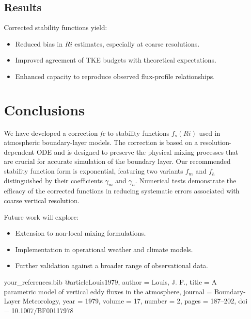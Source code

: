 \documentclass[12pt]{article}
\begin{document}
\subsection{Results}

Corrected stability functions yield:
\begin{itemize}
    \item Reduced bias in \(Ri\) estimates, especially at coarse resolutions.
    \item Improved agreement of TKE budgets with theoretical expectations.
    \item Enhanced capacity to reproduce observed flux-profile relationships.
\end{itemize}

\section{Conclusions}

We have developed a correction \emph{fc} to stability functions \(f_s(Ri)\) used in atmospheric boundary-layer models. The correction is based on a resolution-dependent ODE and is designed to preserve the physical mixing processes that are crucial for accurate simulation of the boundary layer. Our recommended stability function form is exponential, featuring two variants \(f_m\) and \(f_h\) distinguished by their coefficients \(\gamma_m\) and \(\gamma_h\). Numerical tests demonstrate the efficacy of the corrected functions in reducing systematic errors associated with coarse vertical resolution.

Future work will explore:
\begin{itemize}
    \item Extension to non-local mixing formulations.
    \item Implementation in operational weather and climate models.
    \item Further validation against a broader range of observational data.
\end{itemize}

\begin{filecontents*}{your_references.bib}
@article{Louis1979,
  author = {Louis, J. F.},
  title = {A parametric model of vertical eddy fluxes in the atmosphere},
  journal = {Boundary-Layer Meteorology},
  year = {1979},
  volume = {17},
  number = {2},
  pages = {187--202},
  doi = {10.1007/BF00117978}
}
\end{filecontents*}



\end{document}
